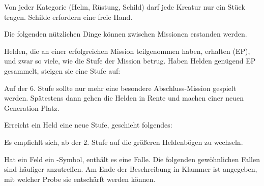 {			\noindent
			Von jeder Kategorie (Helm, Rüstung, Schild) darf jede Kreatur nur ein Stück tragen. Schilde erfordern eine freie Hand.

			Die folgenden nützlichen Dinge können zwischen Missionen erstanden werden.


		Helden, die an einer erfolgreichen Mission teilgenommen haben, erhalten  (EP), und zwar so viele, wie die Stufe der Mission betrug. Haben Helden genügend EP gesammelt, steigen sie eine Stufe auf:

		\medskip
		\medskip

		Auf der 6. Stufe sollte nur mehr eine besondere Abschluss-Mission gespielt werden. Spätestens dann gehen die Helden in Rente und machen einer neuen Generation Platz.

			Erreicht ein Held eine neue Stufe, geschieht folgendes:


		Es empfiehlt sich, ab der 2. Stufe auf die größeren Heldenbögen zu wechseln.


		Hat ein Feld ein \trap-Symbol, enthält es eine Falle. Die folgenden gewöhnlichen Fallen sind häufiger anzutreffen. Am Ende der Beschreibung in Klammer ist angegeben, mit welcher Probe sie entschärft werden können.

}
